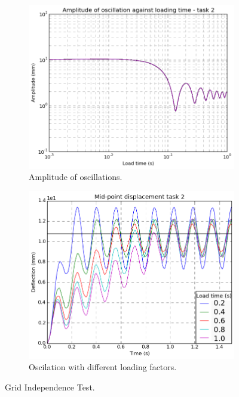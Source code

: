 \documentclass[10pt, a4paper]{article}
\begin{document}
\begin{figure}[!htb]
\centering
\begin{subfigure}{.5\textwidth}
  \centering
  \includegraphics[width=1\linewidth]{task2_amplitude}
  \caption{Amplitude of oscillations.}
  \label{fig:amplitude2}
\end{subfigure}%
\begin{subfigure}{.5\textwidth}
  \centering
  \includegraphics[width=1\linewidth]{task2_deflection}
  \caption{Oscilation with different loading factors.}
  \label{fig:deflection2}
\end{subfigure}
\caption{Grid Independence Test.}
\label{fig:task2}
\end{figure}
\end{document}
